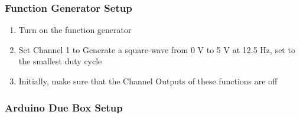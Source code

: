 \documentclass{article}
\begin{document}
        \subsubsection{Function Generator Setup}
        
        \begin{enumerate}[label=\textbf{\arabic*}]
            \item Turn on the function generator
            \item Set Channel 1 to Generate a square-wave from 0 V to 5 V at 12.5 Hz, set to the smallest duty cycle
            \item Initially, make sure that the Channel Outputs of these functions are off
        \end{enumerate}
        
        \subsubsection{Arduino Due Box Setup}
        
\end{document}
